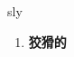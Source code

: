 
\begin{frame}
{\huge sly}
\begin{center}
\begin{enumerate}\Large
  \item \textbf{狡猾的}
\end{enumerate}
\end{center}
\end{frame}
